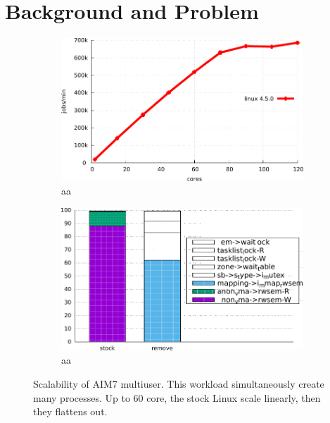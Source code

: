 \section{Background and Problem}


\begin{figure}
  \begin{subfigure}[b]{0.23\textwidth}
    \includegraphics[width=\textwidth]{graph/aim7_default}
    \caption{aa}
  \end{subfigure}%
  \begin{subfigure}[b]{0.25\textwidth}
    \includegraphics[width=\textwidth]{graph/lockstat}
    \caption{aa}
  \end{subfigure}
  \centering
  \caption{Scalability of AIM7 multiuser. This workload simultaneously create
  many processes.
  Up to 60 core, the stock Linux scale linearly, then they flattens out.}
  \label{fig:aim7_default}
\end{figure}
 
